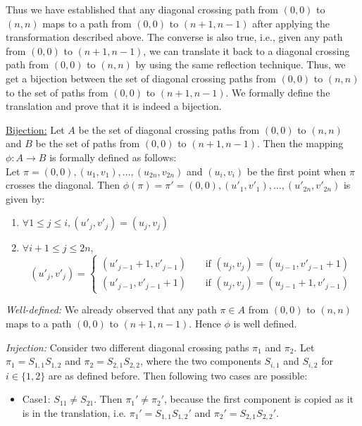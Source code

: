 Thus we have established that any diagonal crossing path from $(0,0)$ to $(n,n)$ maps to a path from $(0,0)$ to $(n+1,n-1)$ after applying the transformation described above. The converse is also true, i.e., given any path from $(0,0)$ to $(n+1, n-1)$, we can translate it back to a diagonal crossing path from $(0,0)$ to $(n,n)$ by using the same reflection technique.  Thus, we get a bijection between the set of diagonal crossing paths from $(0,0)$ to $(n,n)$ to the set of paths from $(0,0)$ to $(n+1,n-1)$. We formally define the translation and prove that it is indeed a bijection.
\begin{description}
\item \underline{Bijection:}
Let $A$ be the set of diagonal crossing paths from $(0,0)$ to $(n,n)$ and $B$ be the set of paths from $(0,0)$ to $(n+1,n-1)$. Then the mapping $\phi:A\rightarrow B$ is formally defined as follows: 
\\
Let $\pi=(0,0), (u_1,v_1), \ldots, (u_{2n}, v_{2n})$ and $(u_i, v_i)$ be the first point when $\pi$ crosses the diagonal. Then $\phi(\pi) = \pi'=(0,0), (u'_1,v'_1), \ldots, (u'_{2n}, v'_{2n})$ is given by:
\begin{enumerate}
    \item $\forall 1\le j\le i, (u'_j, v'_j) = (u_j, v_j)$
    \item $\forall i+1\le j\le 2n$, 
    \[
    (u'_j, v'_j) = 
    \begin{cases}
    (u'_{j-1}+1, v'_{j-1})& ~~~~~\text{if } (u_j, v_j) = (u_{j-1}, v'_{j-1}+1)\\
    (u'_{j-1}, v'_{j-1}+1)& ~~~~~\text{if } (u_j, v_j) = (u_{j-1}+1, v'_{j-1})
    \end{cases}
    \]
\end{enumerate}
\item \textit{Well-defined:} We already observed that any path $\pi\in A$ from $(0,0)$ to $(n,n)$ maps to a path $(0,0)$ to $(n+1,n-1)$. Hence $\phi$ is well defined.
\item \textit{Injection:} Consider two different diagonal crossing paths $\pi_1$ and $\pi_2$. Let $\pi_1 = S_{1,1}S_{1,2}$ and $\pi_2 = S_{2,1}S_{2,2}$, where the two components $S_{i,1}$ and $S_{i,2}$ for $i\in\{1,2\}$ are as defined before. Then following two cases are possible:
\begin{itemize}
    \item Case1: $S_{11}\ne S_{21}$. Then $\pi_1'\ne \pi_2'$, because the first component is copied as it is in the translation, i.e. $\pi_1' = S_{1,1}S_{1,2}'$ and $\pi_2' = S_{2,1}S_{2,2}'$.

\end{itemize}
\end{description}
